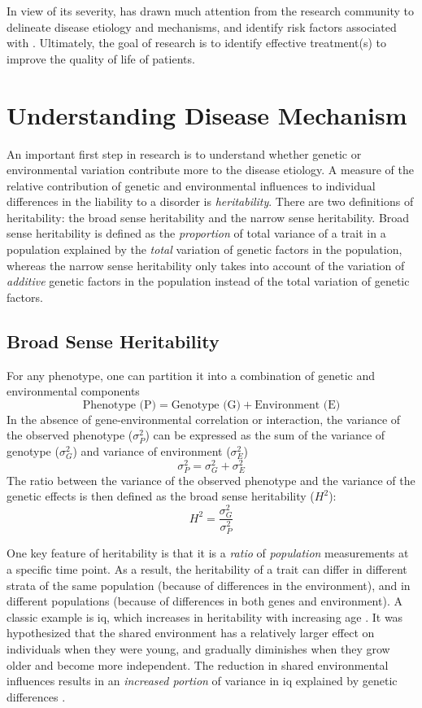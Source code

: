 	In view of its severity,  has drawn much attention from the research community to delineate disease etiology and mechanisms, and identify risk factors associated with .
	Ultimately, the goal of  research is to identify effective treatment(s) to improve the quality of life of patients.
	
	\section{Understanding Disease Mechanism}
	An important first step in  research is to understand whether genetic or environmental variation contribute more to the disease etiology.
	A measure of the relative contribution of genetic and environmental influences to individual differences in the liability to a disorder is \emph{heritability}.
	There are two definitions of heritability: the broad sense heritability and the narrow sense heritability.
	Broad sense heritability is defined as the \emph{proportion} of total variance of a trait in a population explained by the \emph{total} variation of genetic factors in the population, whereas the narrow sense heritability only takes into account of the variation of \emph{additive} genetic factors in the population instead of the total variation of genetic factors.
	
	\subsection{Broad Sense Heritability}
	For any phenotype, one can partition it into a combination of genetic and environmental components \citep{Falconer1996}
	$$
	\text{Phenotype (P)}=\text{Genotype (G)}+\text{Environment (E)}
	$$
	In the absence of gene-environmental correlation or interaction, the variance of the observed phenotype ($\sigma_P^2$) can be expressed as the sum of the variance of genotype ($\sigma_G^2$) and variance of environment ($\sigma_E^2$)
	$$
	\sigma_P^2=\sigma_G^2+\sigma_E^2
	$$
	The ratio between the variance of the observed phenotype and the variance of the genetic effects is then defined as the broad sense heritability ($H^2$):
	$$
	H^2=\frac{\sigma_G^2}{\sigma_P^2}
	$$
	
	One key feature of heritability is that it is a \emph{ratio} of \emph{population} measurements at a specific time point.
	As a result, the heritability of a trait can differ in different strata of the same population (because of differences in the environment), and in different populations (because of differences in both genes and environment).
	A classic example is \gls{iq}, which increases in heritability with increasing age \citep{Bouchard2013}.
	It was hypothesized that the shared environment has a relatively larger effect on individuals when they were young, and gradually diminishes when they grow older and become more independent.
	The reduction in shared environmental influences results in an \emph{increased portion} of variance in \gls{iq} explained by genetic differences \citep{Bouchard2013}. 
	
